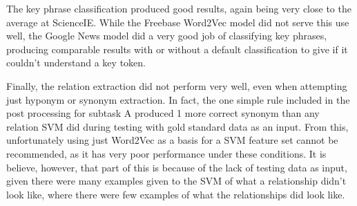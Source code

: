 The key phrase classification produced good results, again being very close to the average at ScienceIE. While the Freebase Word2Vec model did not serve this use well, the Google News model did a very good job of classifying key phrases, producing comparable results with or without a default classification to give if it couldn't understand a key token. 

Finally, the relation extraction did not perform very well, even when attempting just hyponym or synonym extraction. In fact, the one simple rule included in the post processing for subtask A produced 1 more correct synonym than any relation SVM did during testing with gold standard data as an input. From this, unfortunately using just Word2Vec as a basis for a SVM feature set cannot be recommended, as it has very poor performance under these conditions. It is believe, however, that part of this is because of the lack of testing data as input, given there were many examples given to the SVM of what a relationship didn't look like, where there were few examples of what the relationships did look like.

